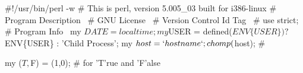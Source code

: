 \documentclass[11pt]{article}
\def\nwendcode{\endtrivlist \endgroup} %
\let\nwdocspar=\par                    %
\begin{document}
\label{todo:AAA}\label{todo:AAB}
\nwenddocs{}%
%
%
\nwdocspar
\nwenddocs{}%
%
%
\nwdocspar
\todo{
 \item \todoAAA
 \item \todoAAB
 } %

\begin{comment}
\end{comment}


% 
% 
% 

\newpage %
\appendix



\begin{comment}
\end{comment}

%
\newpage %



\nwenddocs{}\endmoddef
#!/usr/bin/perl -w
# This is perl, version 5.005_03 built for i386-linux
#
\LA{}Program Description~{\nwtagstyle{}}\RA{}
#
\LA{}GNU License~{\nwtagstyle{}}\RA{}
#
\LA{}Version Control Id Tag~{\nwtagstyle{}}\RA{}
#
use strict;
#
\LA{}Program Info~{\nwtagstyle{}}\RA{}
my $DATE = localtime;
my $USER = defined($ENV\{USER\}) ? $ENV\{USER\} : 'Child Process';
my $host = `hostname`;
chomp($host);
#
\nwendcode{}\nwdocspar

\nwenddocs{}\endmoddef
my ($T,$F) = (1,0); # for 'T'rue and 'F'alse
\eatline
{}\nwendcode{}\nwdocspar
\end{document}
